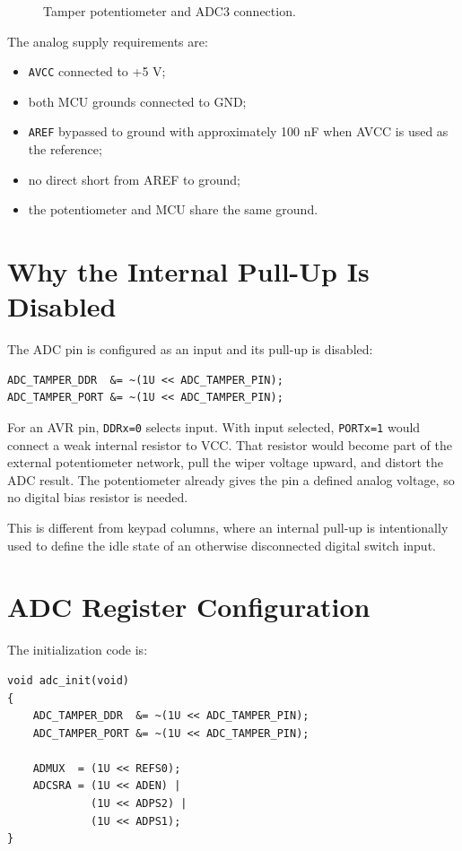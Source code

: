 \documentclass[11pt,a4paper]{article}
\begin{document}
\begin{figure}[H]
\centering
{}
\caption{Tamper potentiometer and ADC3 connection.}
\end{figure}

The analog supply requirements are:
\begin{itemize}
  \item \texttt{AVCC} connected to +5 V;
  \item both MCU grounds connected to GND;
  \item \texttt{AREF} bypassed to ground with approximately 100 nF when AVCC is used as the reference;
  \item no direct short from AREF to ground;
  \item the potentiometer and MCU share the same ground.
\end{itemize}

\section{Why the Internal Pull-Up Is Disabled}
The ADC pin is configured as an input and its pull-up is disabled:
\begin{lstlisting}[style=cstyle]
ADC_TAMPER_DDR  &= ~(1U << ADC_TAMPER_PIN);
ADC_TAMPER_PORT &= ~(1U << ADC_TAMPER_PIN);
\end{lstlisting}
For an AVR pin, \texttt{DDRx=0} selects input. With input selected, \texttt{PORTx=1} would connect a weak internal resistor to VCC. That resistor would become part of the external potentiometer network, pull the wiper voltage upward, and distort the ADC result. The potentiometer already gives the pin a defined analog voltage, so no digital bias resistor is needed.

This is different from keypad columns, where an internal pull-up is intentionally used to define the idle state of an otherwise disconnected digital switch input.

\section{ADC Register Configuration}
The initialization code is:
\begin{lstlisting}[style=cstyle,caption={ADC initialization for the tamper sensor.}]
void adc_init(void)
{
    ADC_TAMPER_DDR  &= ~(1U << ADC_TAMPER_PIN);
    ADC_TAMPER_PORT &= ~(1U << ADC_TAMPER_PIN);

    ADMUX  = (1U << REFS0);
    ADCSRA = (1U << ADEN) |
             (1U << ADPS2) |
             (1U << ADPS1);
}
\end{lstlisting}
\end{document}
